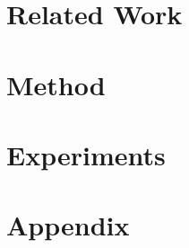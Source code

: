 \documentclass[10pt,twocolumn,letterpaper]{article}
\begin{document}
\section{Related Work}


\section{Method}


\section{Experiments}


\section{Appendix}





{\small


}
\end{document}
